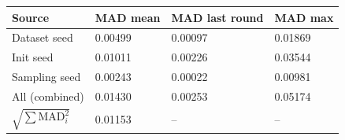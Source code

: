 \begin{tabular}{llll}
\toprule
Source & MAD mean & MAD last round & MAD max \\
\midrule
Dataset seed & 0.00499 & 0.00097 & 0.01869 \\
Init seed & 0.01011 & 0.00226 & 0.03544 \\
Sampling seed & 0.00243 & 0.00022 & 0.00981 \\
\midrule
All (combined) & 0.01430 & 0.00253 & 0.05174 \\
$\sqrt{\sum \text{MAD}_i^2}$ & 0.01153 & -- & -- \\
\bottomrule
\end{tabular}
